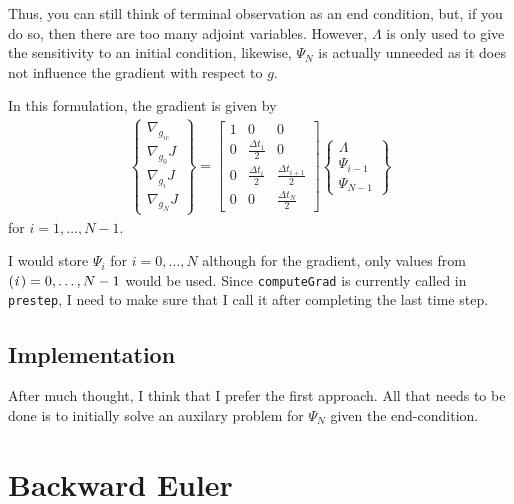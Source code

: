 \documentclass[10pt]{article}
\begin{document}
Thus, you can still think of terminal observation as an end condition, but, if
you do so, then there are too many adjoint variables.  However, $\Lambda$ is
only used to give the sensitivity to an initial condition, likewise, $\Psi_N$
is actually unneeded as it does not influence the gradient with respect to
$g$.

In this formulation, the gradient is given by
\begin{eqnarray}
\left\{\begin{array}{c} 
\nabla_{g_{ic}} \\ \nabla_{g_0} J \\ \nabla_{g_i} J \\ \nabla_{g_N} J 
\end{array}\right\} = 
\left[ \begin{array}{ccc} 
1 & 0 & 0 \\
0 & \frac{\Delta t_1}{2} & 0 \\
0 & \frac{\Delta t_{i}}{2} & \frac{\Delta t_{i+1}}{2} \\
0 & 0 & \frac{\Delta t_N}{2}
\end{array} \right] 
\left\{\begin{array}{c} 
\Lambda \\ \Psi_{i-1} \\ \Psi_{N-1} 
\end{array}\right\}
\end{eqnarray}
for $i=1,\dots,N-1$.

I would store $\Psi_i$ for $i=0,\dots,N$ although for the gradient, only
values from $\i=0,\dots,N-1$ would be used.  Since {\tt computeGrad} is
currently called in {\tt prestep}, I need to make sure that I call it after
completing the last time step.

\subsection*{Implementation}

After much thought, I think that I prefer the first approach. All that needs
to be done is to initially solve an auxilary problem for $\Psi_N$ given the
end-condition.

%
\section*{Backward Euler}
\end{document}
